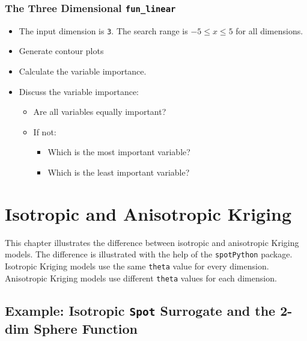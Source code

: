 \documentclass[
  letterpaper,
  DIV=11,
  numbers=noendperiod]{scrreprt}
\providecommand{\tightlist}{%
  \setlength{\itemsep}{0pt}\setlength{\parskip}{0pt}}\usepackage{longtable,booktabs,array}
\begin{document}
\hypertarget{the-three-dimensional-fun_linear}{%
\subsection{\texorpdfstring{The Three Dimensional
\texttt{fun\_linear}}{The Three Dimensional fun\_linear}}\label{the-three-dimensional-fun_linear}}

\begin{itemize}
\tightlist
\item
  The input dimension is \texttt{3}. The search range is
  \(-5 \leq x \leq 5\) for all dimensions.
\item
  Generate contour plots
\item
  Calculate the variable importance.
\item
  Discuss the variable importance:

  \begin{itemize}
  \tightlist
  \item
    Are all variables equally important?
  \item
    If not:

    \begin{itemize}
    \tightlist
    \item
      Which is the most important variable?
    \item
      Which is the least important variable?
    \end{itemize}
  \end{itemize}
\end{itemize}

\hypertarget{sec-iso-aniso-kriging}{%
\chapter{Isotropic and Anisotropic
Kriging}\label{sec-iso-aniso-kriging}}

This chapter illustrates the difference between isotropic and
anisotropic Kriging models. The difference is illustrated with the help
of the \texttt{spotPython} package. Isotropic Kriging models use the
same \texttt{theta} value for every dimension. Anisotropic Kriging
models use different \texttt{theta} values for each dimension.

\hypertarget{example-isotropic-spot-surrogate-and-the-2-dim-sphere-function}{%
\section{\texorpdfstring{Example: Isotropic \texttt{Spot} Surrogate and
the 2-dim Sphere
Function}{Example: Isotropic Spot Surrogate and the 2-dim Sphere Function}}\label{example-isotropic-spot-surrogate-and-the-2-dim-sphere-function}}
\end{document}
